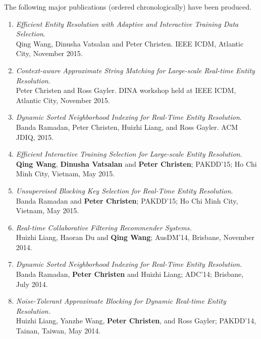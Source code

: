\documentclass[a4paper,oneside,12pt]{article}
\begin{document}
\noindent
The following major publications (ordered chronologically) have been
produced.
%
\setlength{\leftmargini}{5mm}
\begin{enumerate}
\setlength{\itemsep}{0mm}
\item {\em Efficient Entity Resolution with Adaptive and
      Interactive Training Data Selection}. \\
      Qing Wang, Dinusha Vatsalan and Peter Christen. IEEE ICDM,
      Atlantic City, November 2015.
\item {\em Context-aware Approximate String Matching for Large-scale
      Real-time Entity Resolution}. \\
      Peter Christen and Ross Gayler. DINA workshop held at IEEE ICDM,
      Atlantic City, November 2015.
\item {\em Dynamic Sorted Neighborhood Indexing for Real-Time
      Entity Resolution}. \\
      Banda Ramadan, Peter Christen, Huizhi Liang, and Ross Gayler.
      ACM JDIQ, 2015.
\item {\em Efficient Interactive Training Selection for Large-scale
      Entity Resolution}. \\
      \textbf{Qing Wang}, \textbf{Dinusha Vatsalan} and \textbf{Peter
      Christen}; PAKDD'15; Ho Chi Minh City, Vietnam, May 2015.
\item {\em Unsupervised Blocking Key Selection for Real-Time Entity
      Resolution}. \\
      Banda Ramadan and \textbf{Peter Christen}; PAKDD'15; Ho Chi Minh
      City, Vietnam, May 2015.
\item {\em Real-time Collaborative Filtering Recommender Systems.} \\
      Huizhi Liang, Haoran Du and \textbf{Qing Wang}; AusDM'14,
      Brisbane, November 2014.
\item {\em Dynamic Sorted Neighborhood Indexing for Real-Time Entity
      Resolution.} \\
      Banda Ramadan, \textbf{Peter Christen} and Huizhi Liang; ADC'14;
      Brisbane, July 2014.
\item {\em Noise-Tolerant Approximate Blocking for Dynamic
      Real-time Entity Resolution.} \\
      Huizhi Liang, Yanzhe Wang, \textbf{Peter Christen}, and
      Ross Gayler; PAKDD'14, Tainan, Taiwan, May 2014.


\end{enumerate}
\end{document}
